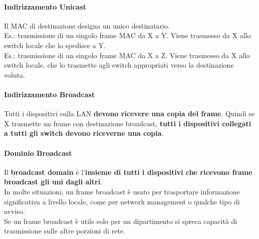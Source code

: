 \documentclass[10pt]{article}
\begin{document}
\begin{multicols}{2}
	\paragraph{Indirizzamento Unicast} Il MAC di destinazione designa un unico destinatario.\\
	Es.: trasmissione di un singolo frame MAC da X a Y. Viene trasmesso da X allo switch locale che lo spedisce a Y.\\
	Es.: trasmissione di un singolo frame MAC da X a Z. Viene trasmesso da X allo switch locale, che lo trasmette agli switch appropriati verso la destinazione voluta.
	\paragraph{Indirizzamento Broadcast} Tutti i dispositivi sulla LAN \textbf{devono ricevere una copia del frame}. Quindi se X trasmette un frame con destinazione broadcast, \textbf{tutti i dispositivi collegati a tutti gli switch devono riceverne una copia}.
	\paragraph{Dominio Broadcast} Il \textbf{broadcast domain} è l'\textbf{insieme di tutti i dispositivi che ricevono frame broadcast gli uni dagli altri}.\\
	In molte situazioni, un frame broadcast è usato per trasportare informazione significativa a livello locale, come per network management o qualche tipo di avviso.\\
	Se un frame broadcast è utile solo per un dipartimento si spreca capacità di trasmissione sulle altre porzioni di rete.
\end{multicols}
\end{document}
